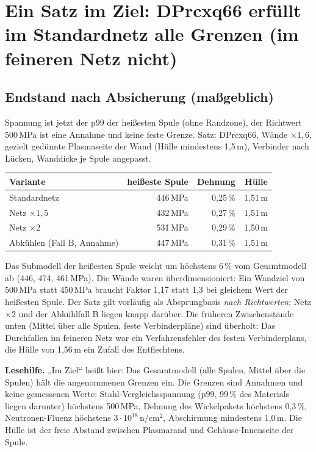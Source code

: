 \section{Ein Satz im Ziel: DPrcxq66 erfüllt im Standardnetz alle Grenzen (im feineren Netz nicht)}\label{sec:ziel}

\subsection*{Endstand nach Absicherung (maßgeblich)}
Spannung ist jetzt der p99 der heißesten Spule (ohne Randzone), der Richtwert 500\,MPa ist eine Annahme und keine feste Grenze. Satz: DPrcxq66, Wände $\times1{,}6$, gezielt gedünnte Plasmaseite der Wand (Hülle mindestens 1,5\,m), Verbinder nach Lücken, Wanddicke je Spule angepasst.

\begin{tabular}{lrrr}
\hline
Variante & heißeste Spule & Dehnung & Hülle \\ \hline
Standardnetz & 446\,MPa & 0,25\,\% & 1,51\,m \\
Netz $\times1{,}5$ & 432\,MPa & 0,27\,\% & 1,51\,m \\
Netz $\times2$ & 531\,MPa & 0,29\,\% & 1,50\,m \\
Abkühlen (Fall B, Annahme) & 447\,MPa & 0,31\,\% & 1,51\,m \\ \hline
\end{tabular}

\smallskip
\noindent Das Submodell der heißesten Spule weicht um höchstens 6\,\% vom Gesamtmodell ab (446, 474, 461\,MPa). Die Wände waren überdimensioniert: Ein Wandziel von 500\,MPa
statt 450\,MPa braucht Faktor 1,17 statt 1,3 bei gleichem Wert der heißesten Spule. Der Satz gilt vorläufig als Absprungbasis \emph{nach Richtwerten}; Netz $\times2$ und der Abkühlfall B liegen knapp darüber.
Die früheren Zwischenstände unten (Mittel über alle Spulen, feste Verbinderpläne) sind überholt: Das Durchfallen im feineren Netz war ein Verfahrensfehler des festen Verbinderplans, die Hülle von 1,56\,m ein Zufall des Entflechtens.


\textbf{Lesehilfe.} „Im Ziel“ heißt hier: Das Gesamtmodell (alle Spulen, Mittel über die Spulen) hält die angenommenen Grenzen ein.
Die Grenzen sind Annahmen und keine gemessenen Werte: Stahl-Vergleichsspannung (p99, 99\,\% des Materials liegen darunter) höchstens 500\,MPa,
Dehnung des Wickelpakets höchstens 0,3\,\%, Neutronen-Fluenz höchstens $3\cdot10^{18}$\,n/cm$^2$, Abschirmung mindestens 1,0\,m.
Die Hülle ist der freie Abstand zwischen Plasmarand und Gehäuse-Innenseite der Spule.

